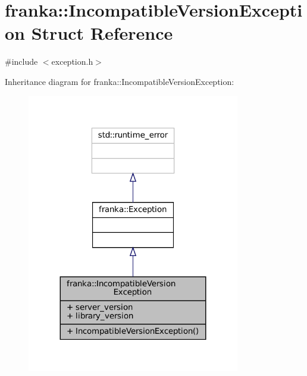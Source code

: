 \hypertarget{structfranka_1_1IncompatibleVersionException}{}\section{franka\+:\+:Incompatible\+Version\+Exception Struct Reference}
\label{structfranka_1_1IncompatibleVersionException}


{\ttfamily \#include $<$exception.\+h$>$}



Inheritance diagram for franka\+:\+:Incompatible\+Version\+Exception\+:
\nopagebreak
\begin{figure}[H]
\begin{center}
\leavevmode
\includegraphics[width=263pt]{structfranka_1_1IncompatibleVersionException__inherit__graph}
\end{center}
\end{figure}


